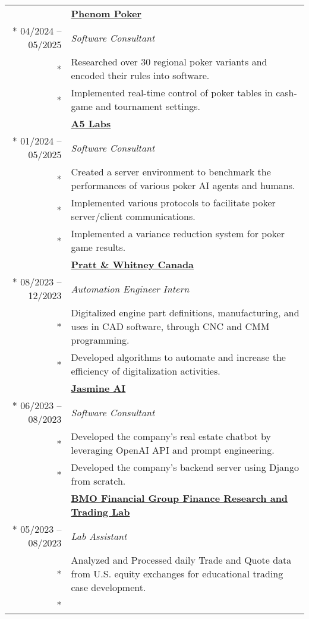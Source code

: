 \documentclass{article}
\begin{document}
	\begin{tabularx}{\textwidth}{r X}
		& \textbf{\href{https://www.phenompoker.com/}{Phenom Poker}} \\*
		04/2024 -- 05/2025 & \textit{Software Consultant} \\*
		& {\small Researched over 30 regional poker variants and encoded their rules into software.} \\*
		& {\small Implemented real-time control of poker tables in cash-game and tournament settings.} \\
		\addlinespace
		& \textbf{\href{https://a5labs.co/}{A5 Labs}} \\*
		01/2024 -- 05/2025 & \textit{Software Consultant} \\*
		& {\small Created a server environment to benchmark the performances of various poker AI agents and humans.} \\*
		& {\small Implemented various protocols to facilitate poker server/client communications.} \\*
		& {\small Implemented a variance reduction system for poker game results.} \\
		\addlinespace
		& \textbf{\href{https://www.prattwhitney.com/}{Pratt \& Whitney Canada}} \\*
		08/2023 -- 12/2023 & \textit{Automation Engineer Intern} \\*
		& {\small Digitalized engine part definitions, manufacturing, and uses in CAD software, through CNC and CMM programming.} \\*
		& {\small Developed algorithms to automate and increase the efficiency of digitalization activities.} \\
		\iftoggle{verbose}{
			\addlinespace
			& \textbf{\href{https://jasminechatbot.com/}{Jasmine AI}} \\*
			06/2023 -- 08/2023 & \textit{Software Consultant} \\*
			& {\small Developed the company's real estate chatbot by leveraging OpenAI API and prompt engineering.} \\*
			& {\small Developed the company's backend server using Django from scratch.} \\
		}{}
		\addlinespace
		& \textbf{\href{https://inside.rotman.utoronto.ca/financelab/}{BMO Financial Group Finance Research and Trading Lab}} \\*
		05/2023 -- 08/2023 & \textit{Lab Assistant} \\*
		& {\small Analyzed and Processed daily Trade and Quote data from U.S. equity exchanges for educational trading case development.} \\*

\end{tabularx}
\end{document}
